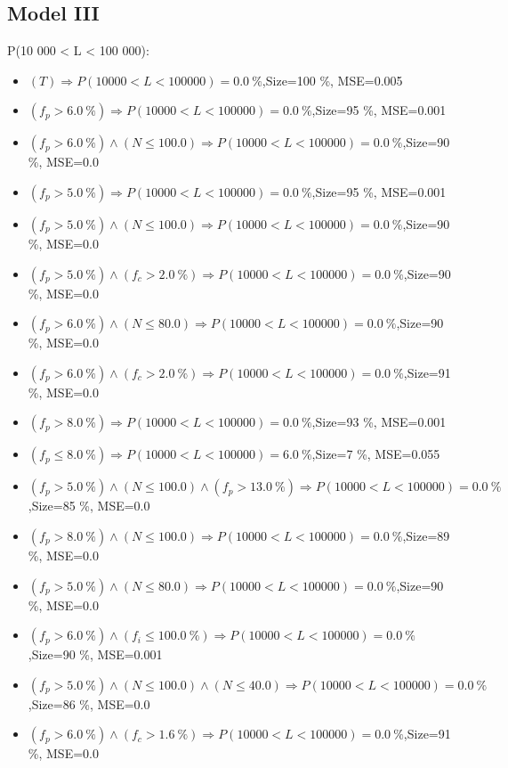 \documentclass[numbered]{CSL}
\begin{document}
\subsection{Model III}
P(10 000 < L < 100 000):
\begin{itemize}
\item $(T) \Rightarrow P(10 000 < L < 100 000) = 0.0~\%$,\hfill Size=100 \%, MSE=0.005
\item $(f_p > 6.0~\%) \Rightarrow P(10 000 < L < 100 000) = 0.0~\%$,\hfill Size=95 \%, MSE=0.001
\item $(f_p > 6.0~\%) \land (N \leq 100.0) \Rightarrow P(10 000 < L < 100 000) = 0.0~\%$,\hfill Size=90 \%, MSE=0.0
\item $(f_p > 5.0~\%) \Rightarrow P(10 000 < L < 100 000) = 0.0~\%$,\hfill Size=95 \%, MSE=0.001
\item $(f_p > 5.0~\%) \land (N \leq 100.0) \Rightarrow P(10 000 < L < 100 000) = 0.0~\%$,\hfill Size=90 \%, MSE=0.0
\item $(f_p > 5.0~\%) \land (f_c > 2.0~\%) \Rightarrow P(10 000 < L < 100 000) = 0.0~\%$,\hfill Size=90 \%, MSE=0.0
\item $(f_p > 6.0~\%) \land (N \leq 80.0) \Rightarrow P(10 000 < L < 100 000) = 0.0~\%$,\hfill Size=90 \%, MSE=0.0
\item $(f_p > 6.0~\%) \land (f_c > 2.0~\%) \Rightarrow P(10 000 < L < 100 000) = 0.0~\%$,\hfill Size=91 \%, MSE=0.0
\item $(f_p > 8.0~\%) \Rightarrow P(10 000 < L < 100 000) = 0.0~\%$,\hfill Size=93 \%, MSE=0.001
\item $(f_p \leq 8.0~\%) \Rightarrow P(10 000 < L < 100 000) = 6.0~\%$,\hfill Size=7 \%, MSE=0.055
\item $(f_p > 5.0~\%) \land (N \leq 100.0) \land (f_p > 13.0~\%) \Rightarrow P(10 000 < L < 100 000) = 0.0~\%$,\hfill Size=85 \%, MSE=0.0
\item $(f_p > 8.0~\%) \land (N \leq 100.0) \Rightarrow P(10 000 < L < 100 000) = 0.0~\%$,\hfill Size=89 \%, MSE=0.0
\item $(f_p > 5.0~\%) \land (N \leq 80.0) \Rightarrow P(10 000 < L < 100 000) = 0.0~\%$,\hfill Size=90 \%, MSE=0.0
\item $(f_p > 6.0~\%) \land (f_i \leq 100.0~\%) \Rightarrow P(10 000 < L < 100 000) = 0.0~\%$,\hfill Size=90 \%, MSE=0.001
\item $(f_p > 5.0~\%) \land (N \leq 100.0) \land (N \leq 40.0) \Rightarrow P(10 000 < L < 100 000) = 0.0~\%$,\hfill Size=86 \%, MSE=0.0
\item $(f_p > 6.0~\%) \land (f_c > 1.6~\%) \Rightarrow P(10 000 < L < 100 000) = 0.0~\%$,\hfill Size=91 \%, MSE=0.0

\end{itemize}
\end{document}
